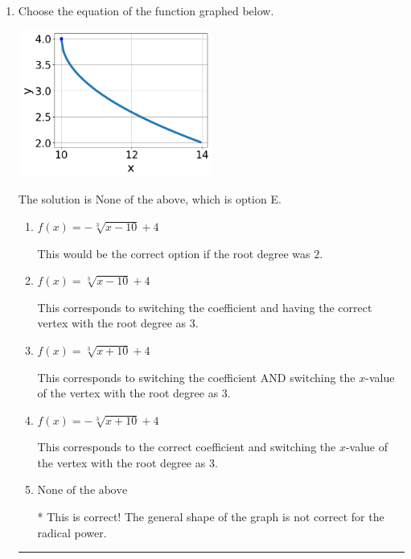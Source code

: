 \documentclass{extbook}[14pt]
\newcommand{\litem}[1]{\item #1

\rule{\textwidth}{0.4pt}}
\begin{document}
\begin{enumerate}\litem{
Choose the equation of the function graphed below.

\begin{center}
    \includegraphics[width=0.5\textwidth]{../Figures/radicalGraphToEquationB.png}
\end{center}


The solution is \( \text{None of the above} \), which is option E.\begin{enumerate}[label=\Alph*.]
\item \( f(x) = - \sqrt[3]{x - 10} + 4 \)

This would be the correct option if the root degree was $2$.
\item \( f(x) = \sqrt[3]{x - 10} + 4 \)

This corresponds to switching the coefficient and having the correct vertex with the root degree as $3$.
\item \( f(x) = \sqrt[3]{x + 10} + 4 \)

This corresponds to switching the coefficient AND switching the $x$-value of the vertex with the root degree as $3$.
\item \( f(x) = - \sqrt[3]{x + 10} + 4 \)

This corresponds to the correct coefficient and switching the $x$-value of the vertex with the root degree as $3$.
\item \( \text{None of the above} \)

* This is correct! The general shape of the graph is not correct for the radical power.
\end{enumerate}

}
\end{enumerate}
\end{document}
